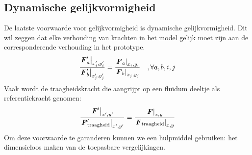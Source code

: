	\subsection{Dynamische gelijkvormigheid}
De laatste voorwaarde voor gelijkvormigheid is dynamische gelijkvormigheid. Dit wil zeggen dat elke verhouding van krachten in het model gelijk moet zijn aan de corresponderende verhouding in het prototype.
\begin{equation}
	\dfrac{\left. \boldsymbol{F}'_a \right|_{x_i',y_i'}}{\left. \boldsymbol{F}'_b \right|_{x_j',y_j'}} = \dfrac{\left. \boldsymbol{F}_a \right|_{x_i,y_i}}{\left. \boldsymbol{F}_b \right|_{x_j,y_j}} \quad, \forall a,b,i,j
	\label{eqn:dynamische gelijkvormigheid}
\end{equation}
Vaak wordt de traagheidskracht die aangrijpt op een flu\"idum deeltje als referentiekracht genomen:
\begin{equation}
	\dfrac{\left. \boldsymbol{F}' \right|_{x',y'}}{\left. \boldsymbol{F}'_{\text{traagheid}} \right|_{x',y'}} = \dfrac{\left. \boldsymbol{F} \right|_{x,y}}{\left. \boldsymbol{F}_{\text{traagheid}} \right|_{x,y}}
	\label{eqn:dynamische gelijkvormigheid traagheid}
\end{equation}
Om deze voorwaarde te garanderen kunnen we een hulpmiddel gebruiken: het dimensieloos maken van de toepasbare vergelijkingen.
